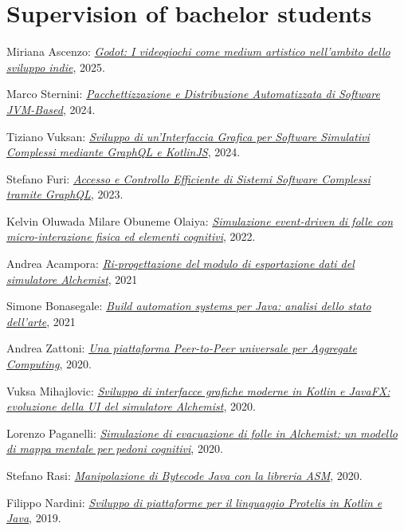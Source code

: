 \section{Supervision of bachelor students}
\vspace{-1em}
\begin{innerlist}
    \item Miriana Ascenzo: \href{https://amslaurea.unibo.it/34508/}{\textit{Godot: I videogiochi come medium artistico nell'ambito dello sviluppo indie}}, 2025.
    \item Marco Sternini: \href{http://amslaurea.unibo.it/31694/}{\textit{Pacchettizzazione e Distribuzione Automatizzata di Software JVM-Based}}, 2024.
    \item Tiziano Vuksan: \href{http://amslaurea.unibo.it/31688/}{\textit{Sviluppo di un'Interfaccia Grafica per Software Simulativi Complessi mediante GraphQL e KotlinJS}}, 2024.
    \item Stefano Furi: \href{http://amslaurea.unibo.it/30280/}{\textit{Accesso e Controllo Efficiente di Sistemi Software Complessi tramite GraphQL}}, 2023.
    \item Kelvin Oluwada Milare Obuneme Olaiya: \href{http://amslaurea.unibo.it/26455/}{\textit{Simulazione event-driven di folle con micro-interazione fisica ed elementi cognitivi}}, 2022.
    \item Andrea Acampora: \href{https://amslaurea.unibo.it/24704/}{\textit{Ri-progettazione del modulo di esportazione dati del simulatore Alchemist}}, 2021
    \item Simone Bonasegale: \href{https://amslaurea.unibo.it/23316/}{\textit{Build automation systems per Java: analisi dello stato dell'arte}}, 2021
    \item Andrea Zattoni: \href{https://archive.ph/CnUXg}{\textit{Una piattaforma Peer-to-Peer universale per Aggregate Computing}}, 2020.
    \item Vuksa Mihajlovic: \href{http://amslaurea.unibo.it/21648/}{\textit{Sviluppo di interfacce grafiche moderne in Kotlin e JavaFX: evoluzione della UI del simulatore Alchemist}}, 2020.
    \item Lorenzo Paganelli: \href{https://amslaurea.unibo.it/20540/}{\textit{Simulazione di evacuazione di folle in Alchemist: un modello di mappa mentale per pedoni cognitivi}}, 2020.
    \item Stefano Rasi: \href{https://amslaurea.unibo.it/20505/}{\textit{Manipolazione di Bytecode Java con la libreria ASM}}, 2020.
    \item Filippo Nardini: \href{https://amslaurea.unibo.it/19778/}{\textit{Sviluppo di piattaforme per il linguaggio Protelis in Kotlin e Java}}, 2019.

\end{innerlist}
